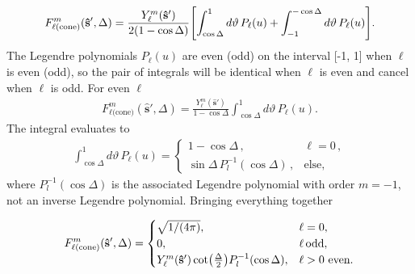 \documentclass[]{osa-article}
\let\originalleft\left
\let\originalright\right
\renewcommand{\left}{\mathopen{}\mathclose\bgroup\originalleft}
\renewcommand{\right}{\aftergroup\egroup\originalright}
\providecommand{\mh}[1]{\mathbf{\hat{#1}}}
\begin{document}
\begin{align}
    F_{\ell\text{(cone)}}^m(\mh{s}', \Delta) = \frac{Y_\ell^m(\mh{s}')}{2(1 - \cos\Delta)}\left[\int_{\cos\Delta}^1 d\vartheta\, P_\ell(u) + \int_{-1}^{-\cos\Delta} d\vartheta\, P_\ell(u)\right]. 
\end{align}
The Legendre polynomials $P_\ell(u)$ are even (odd) on the interval [-1, 1] when
$\ell$ is even (odd), so the pair of integrals will be identical when $\ell$ is
even and cancel when $\ell$ is odd. For even $\ell$
\begin{align}
  F_{\ell\text{(cone)}}^m(\mh{s}', \Delta) = \frac{Y_\ell^m(\mh{s}')}{1 - \cos\Delta}\int_{\cos\Delta}^1 d\vartheta\, P_\ell(u).
\end{align}
The integral evaluates to \cite[ch.~7.111]{gradshteyn2007}
\begin{align}
  \int_{\cos\Delta}^1 d\vartheta\, P_\ell(u) =
\begin{cases}
  1 - \cos\Delta\,, &\ell = 0\,,\\
  \sin\Delta\, P_l^{-1}(\cos\Delta)\,, &\text{else},
\end{cases}
\end{align}
where $P_l^{-1}(\cos\Delta)$ is the associated Legendre polynomial with order
$m=-1$, not an inverse Legendre polynomial. Bringing everything together

\begin{align}
  F_{\ell\text{(cone)}}^m(\mh{s}', \Delta) =
  \begin{cases}
    \sqrt{1/(4\pi)}, & \ell = 0,\\
    0, & \ell\, \text{odd},\\
    Y_\ell^m(\mh{s}')\cot\left(\frac{\Delta}{2}\right)P_l^{-1}(\cos\Delta), & \ell > 0\,\, \text{even}.
  \end{cases}
\end{align}
\end{document}
